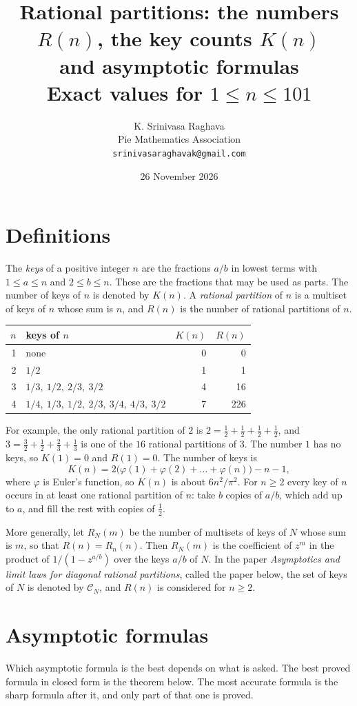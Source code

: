 \documentclass[10pt]{article}
\title{Rational partitions: the numbers $R(n)$, the key counts $K(n)$\\ and asymptotic formulas\\[2pt]
 \large Exact values for $1\le n\le 101$}
\author{K. Srinivasa Raghava\\ \small Pie Mathematics Association\\ \small\texttt{srinivasaraghavak@gmail.com}}
\date{26 November 2026}
\begin{document}
\maketitle

\section*{Definitions}
The \emph{keys} of a positive integer $n$ are the fractions $a/b$ in lowest terms with $1\le a\le n$ and
$2\le b\le n$. These are the fractions that may be used as parts. The number of keys of $n$ is denoted by $K(n)$.
A \emph{rational partition} of $n$ is a multiset of keys of $n$ whose sum is $n$, and $R(n)$ is the number of
rational partitions of $n$.

\begin{center}
\begin{tabular}{rlrr}
\toprule
$n$ & keys of $n$ & $K(n)$ & $R(n)$\\
\midrule
1 & none & 0 & 0\\
2 & $1/2$ & 1 & 1\\
3 & $1/3,\ 1/2,\ 2/3,\ 3/2$ & 4 & 16\\
4 & $1/4,\ 1/3,\ 1/2,\ 2/3,\ 3/4,\ 4/3,\ 3/2$ & 7 & 226\\
\bottomrule
\end{tabular}
\end{center}

For example, the only rational partition of $2$ is $2=\frac12+\frac12+\frac12+\frac12$, and
$3=\frac32+\frac12+\frac23+\frac13$ is one of the $16$ rational partitions of $3$.
The number $1$ has no keys, so $K(1)=0$ and $R(1)=0$. The number of keys is
\[
 K(n)=2\bigl(\varphi(1)+\varphi(2)+\dots+\varphi(n)\bigr)-n-1,
\]
where $\varphi$ is Euler's function, so $K(n)$ is about $6n^2/\pi^2$. For $n\ge2$ every key of $n$ occurs in at
least one rational partition of $n$: take $b$ copies of $a/b$, which add up to $a$, and fill the rest with
copies of $\frac12$.

More generally, let $R_N(m)$ be the number of multisets of keys of $N$ whose sum is $m$, so that $R(n)=R_n(n)$.
Then $R_N(m)$ is the coefficient of $z^m$ in the product of $1/(1-z^{a/b})$ over the keys $a/b$ of $N$.
In the paper \emph{Asymptotics and limit laws for diagonal rational partitions}, called the paper below, the set
of keys of $N$ is denoted by $\mathcal C_N$, and $R(n)$ is considered for $n\ge2$.

\section*{Asymptotic formulas}
Which asymptotic formula is the best depends on what is asked. The best proved formula in closed form is the
theorem below. The most accurate formula is the sharp formula after it, and only part of that one is proved.
\end{document}
